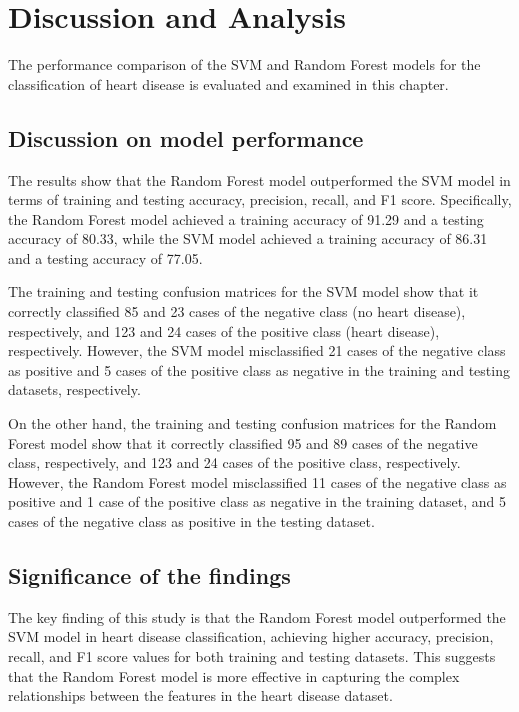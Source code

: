 \chapter{Discussion and Analysis}
\label{ch:evaluation}

The performance comparison of the SVM and Random Forest models for the classification of heart disease is evaluated and examined in this chapter.


\section{Discussion on model performance}
The results show that the Random Forest model outperformed the SVM model in terms of training and testing accuracy, precision, recall, and F1 score. Specifically, the Random Forest model achieved a training accuracy of 91.29 and a testing accuracy of 80.33, while the SVM model achieved a training accuracy of 86.31 and a testing accuracy of 77.05.

The training and testing confusion matrices for the SVM model show that it correctly classified 85 and 23 cases of the negative class (no heart disease), respectively, and 123 and 24 cases of the positive class (heart disease), respectively. However, the SVM model misclassified 21 cases of the negative class as positive and 5 cases of the positive class as negative in the training and testing datasets, respectively.

On the other hand, the training and testing confusion matrices for the Random Forest model show that it correctly classified 95 and 89 cases of the negative class, respectively, and 123 and 24 cases of the positive class, respectively. However, the Random Forest model misclassified 11 cases of the negative class as positive and 1 case of the positive class as negative in the training dataset, and 5 cases of the negative class as positive in the testing dataset.



\section{Significance of the findings}
The key finding of this study is that the Random Forest model outperformed the SVM model in heart disease classification, achieving higher accuracy, precision, recall, and F1 score values for both training and testing datasets. This suggests that the Random Forest model is more effective in capturing the complex relationships between the features in the heart disease dataset.

